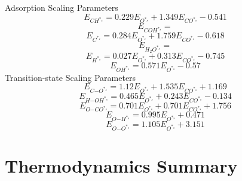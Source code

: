 \documentclass[a4paper,8pt]{report}
\begin{document}
Adsorption Scaling Parameters\\
\begin{equation}
\label{ads_scaling_1}
E_{CH^{*_s}} = 0.229E_{O^{*_s}} + 1.349E_{CO^{*_s}} - 0.541
\end{equation}
\begin{equation}
\label{ads_scaling_2}
E_{COH^{*_s}} = 
\end{equation}
\begin{equation}
\label{ads_scaling_3}
E_{C^{*_s}} = 0.284E_{O^{*_s}} + 1.759E_{CO^{*_s}} - 0.618
\end{equation}
\begin{equation}
\label{ads_scaling_4}
E_{H_{2}O^{*_s}} = 
\end{equation}
\begin{equation}
\label{ads_scaling_5}
E_{H^{*_s}} = 0.027E_{O^{*_s}} + 0.313E_{CO^{*_s}} - 0.745
\end{equation}
\begin{equation}
\label{ads_scaling_6}
E_{OH^{*_s}} = 0.571E_{O^{*_s}} - 0.57
\end{equation}
Transition-state Scaling Parameters\\
\begin{equation}
\label{TS_scaling_1}
E_{C\mathrm{-}O^{*_s}} = 1.12E_{O^{*_s}} + 1.535E_{CO^{*_s}} + 1.169
\end{equation}
\begin{equation}
\label{TS_scaling_2}
E_{H\mathrm{-}OH^{*_s}} = 0.465E_{O^{*_s}} + 0.243E_{CO^{*_s}} - 0.134
\end{equation}
\begin{equation}
\label{TS_scaling_3}
E_{O\mathrm{-}CO^{*_s}} = 0.701E_{O^{*_s}} + 0.701E_{CO^{*_s}} + 1.756
\end{equation}
\begin{equation}
\label{TS_scaling_4}
E_{O\mathrm{-}H^{*_s}} = 0.995E_{O^{*_s}} + 0.471
\end{equation}
\begin{equation}
\label{TS_scaling_5}
E_{O\mathrm{-}O^{*_s}} = 1.105E_{O^{*_s}} + 3.151
\end{equation}\section{Thermodynamics Summary}
\end{document}
